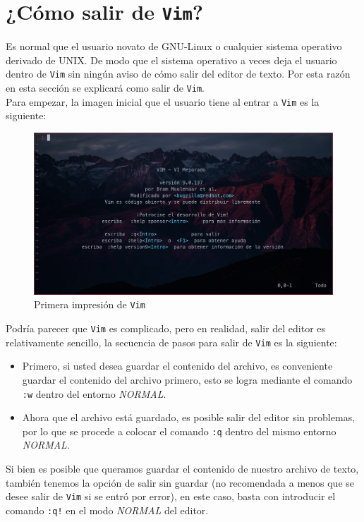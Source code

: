 \documentclass[10pt]{article}
\begin{document}
\section{¿Cómo salir de \texttt{Vim}?}
Es normal que el usuario novato de GNU-Linux o cualquier sistema operativo derivado de UNIX. De modo que el sistema operativo a veces deja el usuario dentro de \texttt{Vim} sin ningún aviso de cómo salir del editor de texto. Por esta razón en esta sección se explicará como salir de \texttt{Vim}. \\
Para empezar, la imagen inicial que el usuario tiene al entrar a \texttt{Vim} es la siguiente: \newline
\begin{figure}[h]
	\centering
	\includegraphics[scale=0.4]{./img/poisson_mu1.png}
	\caption{Primera impresión de \texttt{Vim}}
\end{figure}
\newline
Podría parecer que \texttt{Vim} es complicado, pero en realidad, salir del editor es relativamente sencillo, la secuencia de pasos para salir de \texttt{Vim} es la siguiente:
\begin{itemize}
	\item Primero, si usted desea guardar el contenido del archivo, es conveniente guardar el contenido del archivo primero, esto se logra mediante el comando \texttt{:w} dentro del entorno \textit{NORMAL}.
	\item Ahora que el archivo está guardado, es posible salir del editor sin problemas, por lo que se procede a colocar el comando \texttt{:q} dentro del mismo entorno \textit{NORMAL}.
\end{itemize}
Si bien es posible que queramos guardar el contenido de nuestro archivo de texto, también tenemos la opción de salir sin guardar (no recomendada a menos que se desee salir de \texttt{Vim} si se entró por error), en este caso, basta con introducir el comando \texttt{:q!} en el modo \textit{NORMAL} del editor.
\end{document}

